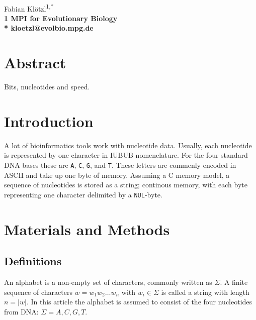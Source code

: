 \documentclass[10pt,letterpaper]{article}
\begin{document}
\vspace*{0.35in}

\begin{flushleft}
{\Large
\textbf{}
}
\newline
\\
Fabian Klötzl\textsuperscript{1,*}
\\
\bigskip
\bf{1} MPI for Evolutionary Biology
\\
\bigskip
* kloetzl@evolbio.mpg.de

\end{flushleft}

\section*{Abstract}
Bits, nucleotides and speed.

\linenumbers

\section{Introduction}
A lot of bioinformatics tools work with nucleotide data. Usually, each nucleotide is represented by one character in IUBUB nomenclature. For the four standard DNA bases these are \lstinline!A!, \lstinline!C!, \lstinline!G!, and \lstinline!T!. These letters are commenly encoded in ASCII and take up one byte of memory. Assuming a C memory model, a sequence of nucleotides is stored as a string; continous memory, with each byte representing one character delimited by a \lstinline!NUL!-byte.

\section{Materials and Methods}

\subsection{Definitions}

An alphabet is a non-empty set of characters, commonly written as $\Sigma$. A finite sequence of characters $w = w_1 w_2 \ldots w_n$ with $w_i \in \Sigma$ is called a string with length $n = |w|$. In this article the alphabet is assumed to consist of the four nucleotides from DNA: $\Sigma = {A,C,G,T}$.
\end{document}

